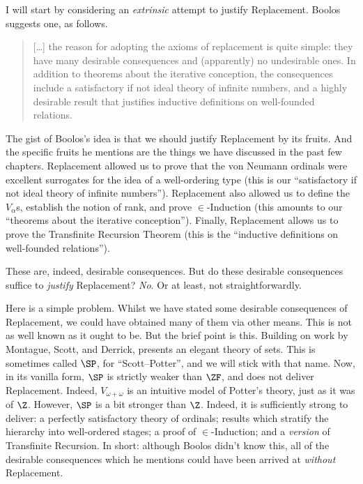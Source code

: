 \documentclass[../../../include/open-logic-section]{subfiles}
\begin{document}
	
I will start by considering an \emph{extrinsic} attempt to justify Replacement. Boolos suggests one, as follows. 
\begin{quote}
	[\ldots] the reason for adopting the axioms of replacement is quite simple: they have many desirable consequences and (apparently) no undesirable ones. In addition to theorems about the iterative conception, the consequences include a satisfactory if not ideal theory of infinite numbers, and a highly desirable result that justifies inductive definitions on well-founded relations. \citep[229]{Boolos1971}
\end{quote}		
The gist of Boolos's idea is that we should justify Replacement by its fruits. And the specific fruits he mentions are the things we have discussed in the past few chapters. Replacement allowed us to prove that the von Neumann ordinals were excellent surrogates for the idea of a well-ordering type (this is our ``satisfactory if not ideal theory of infinite numbers''). Replacement also allowed us to define the $V_\alpha$s, establish the notion of rank, and prove $\in$-Induction (this amounts to our ``theorems about the iterative conception''). Finally, Replacement allows us to prove the Transfinite Recursion Theorem (this is the ``inductive definitions on well-founded relations''). 

These are, indeed, desirable consequences. But do these desirable consequences suffice to \emph{justify} Replacement? \emph{No}. Or at least, not straightforwardly. 

Here is a simple problem. Whilst we have stated some desirable consequences of Replacement, we could have obtained many of them via other means. This is not as well known as it ought to be. But the brief point is this. Building on work by Montague, Scott, and Derrick, \cite{Potter2004} presents an elegant theory of sets. This is sometimes called $\SP$, for ``Scott--Potter'', and we will stick with that name. Now, in its vanilla form, $\SP$ is strictly weaker than $\ZF$, and does not deliver Replacement. Indeed, $V_{\omega+\omega}$ is an intuitive model of Potter's theory, just as it was of $\Z$. However, $\SP$ is a bit stronger than $\Z$. Indeed, it is sufficiently strong to deliver: a perfectly satisfactory theory of ordinals; results which stratify the hierarchy into well-ordered stages; a proof of $\in$-Induction; and a \emph{version} of Transfinite Recursion. In short: although Boolos didn't know this, all of the desirable consequences which he mentions could have been arrived at \emph{without} Replacement.
\end{document}
